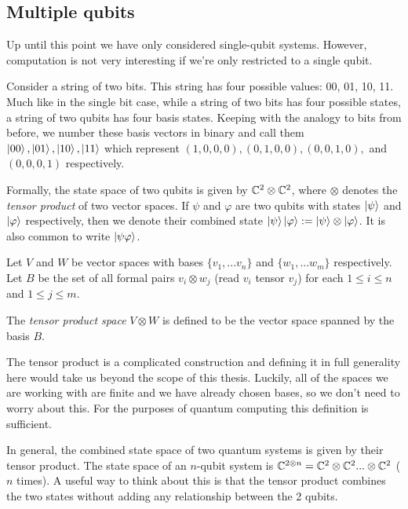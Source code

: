 \subsection{Multiple qubits} 

        Up until this point we have only considered single-qubit systems. However, computation is not very 
        interesting if we're only restricted to a single qubit. 

        Consider a string of two bits. This string has four possible values: 00, 01, 10, 11. Much like in the 
        single bit case, while a string of two bits has four possible states, a string of two qubits has four basis 
        states. Keeping with the analogy to bits from before, we number these basis vectors in binary and call them 
        $ \ket{00}, \ket{01}, \ket{10}, \ket{11}$ which represent $(1,0,0,0), (0,1,0,0), (0,0,1,0),$ and 
        $(0,0,0,1)$ respectively.
        
        Formally, the state space of two qubits is given by $\mathbb{C}^2 \otimes \mathbb{C}^2$, where $\otimes$  denotes the 
        \emph{tensor product}  of two vector spaces. If $\psi$ and $\varphi$ are two qubits with states 
        $\ket{\psi}$ and $\ket{\varphi}$ respectively, then we denote their combined state $\ket{\psi}\ket\varphi 
        := \ket{\psi} \otimes \ket{\varphi}$. It is also common to write $\ket{\psi\varphi}$.

        \begin{definition}
            Let $V$ and $W$ be vector spaces with bases $\{v_1,...v_n\}$ and $\{w_1, ...w_m\}$ respectively.
            Let $B$ be the set of all formal pairs $v_i \otimes w_j$ (read $v_i$ tensor $v_j$) for each $1 \leq i 
            \leq n$ and $1 \leq j \leq m$.

            The \emph{tensor product space} $V \otimes W$ is defined to be the vector space spanned by the basis 
        $B$.  \end{definition}
        
        The tensor product is a complicated construction and defining it in full generality here would take us 
        beyond the scope of this thesis. Luckily, all of the spaces we are working with are finite and we have 
        already chosen bases, so we don't need to worry about this. For the purposes of quantum computing this 
        definition is sufficient. 

        In general, the combined state space of two quantum systems is given by their tensor product. The state 
        space of an $n$-qubit system is $\mathbb{C}^{2\otimes n} = \mathbb{C}^2 \otimes \mathbb{C}^2 ... \otimes \mathbb{C}^2$ ($n$ times). A 
        useful way to think about this is that the tensor product combines the two states without adding any 
        relationship between the 2 qubits.

